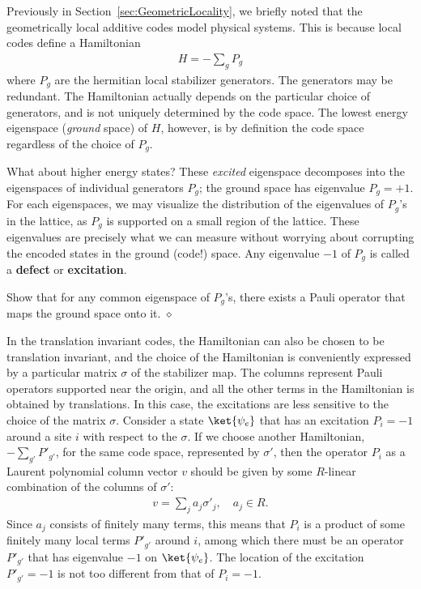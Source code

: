 Previously in Section~\ref{sec:GeometricLocality},
we briefly noted that the geometrically local additive codes model
physical systems.
This is because local codes define a Hamiltonian
\begin{align}
H = - \sum_g P_g
\label{eq:Hamiltonian}
\end{align}
where $P_g$ are the hermitian local stabilizer generators.
The generators may be redundant.
The Hamiltonian actually depends on the particular choice
of generators, and is not uniquely determined by the code space.
The lowest energy eigenspace ({\em ground} space) of $H$, however, is by definition 
the code space regardless of the choice of $P_g$.

What about higher energy states?
These {\em excited} eigenspace decomposes into the eigenspaces of individual generators $P_g$;
the ground space has eigenvalue $P_g = +1$.
For each eigenspaces, 
we may visualize the distribution of the eigenvalues of $P_g$'s in the lattice,
as $P_g$ is supported on a small region of the lattice.
These eigenvalues are precisely what we can measure
without worrying about corrupting the encoded states in the ground (code!) space.
Any eigenvalue $-1$ of $P_g$ is called a {\bf defect} or {\bf excitation}.
\begin{exc}
Show that for any common eigenspace of $P_g$'s, 
there exists a Pauli operator that maps the ground space onto it.
\hfill $\diamond$ \end{exc}

In the translation invariant codes, the Hamiltonian can also be chosen to be translation invariant,
and the choice of the Hamiltonian is conveniently expressed by
a particular matrix $\sigma$ of the stabilizer map.
The columns represent Pauli operators supported near the origin,
and all the other terms in the Hamiltonian is obtained by translations.
In this case, the excitations are less sensitive to the choice of the matrix $\sigma$.
Consider a state $\ket{\psi_e}$ that has an excitation $P_i = -1$ around a site $i$ with respect to the $\sigma$.
If we choose another Hamiltonian, $- \sum_{g'} P'_{g'}$, for the same code space, represented by $\sigma'$,
then the operator $P_i$ as a Laurent polynomial column vector $v$ should be given by
some $R$-linear combination of the columns of $\sigma'$:
\begin{align}
v = \sum_j a_j \sigma'_j, \quad a_j \in R.
\end{align}
Since $a_j$ consists of finitely many terms,
this means that $P_i$ is a product of some finitely many local terms $P'_{g'}$ around $i$,
among which there must be an operator $P'_{g'}$ that has eigenvalue $-1$ on $\ket{ \psi_e}$.
The location of the excitation $P'_{g'} = -1$ is not too different from that of $P_i = -1$.

